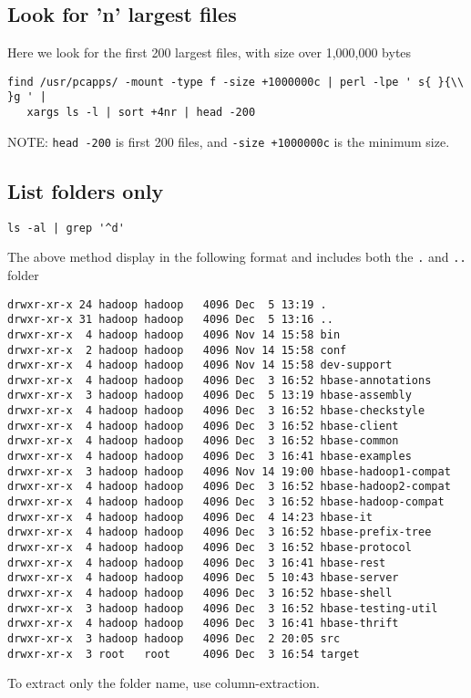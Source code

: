 \subsection{Look for 'n' largest files}

Here we look for the first 200 largest files, with size over 1,000,000 bytes
\begin{verbatim}
find /usr/pcapps/ -mount -type f -size +1000000c | perl -lpe ' s{ }{\\ }g ' |
   xargs ls -l | sort +4nr | head -200
\end{verbatim}
NOTE: \verb!head -200! is first 200 files, and \verb!-size +1000000c! is the
minimum size.

\subsection{List folders only}

\begin{verbatim}
ls -al | grep '^d'
\end{verbatim}
The above method display in the following format and includes both the
\verb!.! and \verb!..! folder
\begin{verbatim}
drwxr-xr-x 24 hadoop hadoop   4096 Dec  5 13:19 .
drwxr-xr-x 31 hadoop hadoop   4096 Dec  5 13:16 ..
drwxr-xr-x  4 hadoop hadoop   4096 Nov 14 15:58 bin
drwxr-xr-x  2 hadoop hadoop   4096 Nov 14 15:58 conf
drwxr-xr-x  4 hadoop hadoop   4096 Nov 14 15:58 dev-support
drwxr-xr-x  4 hadoop hadoop   4096 Dec  3 16:52 hbase-annotations
drwxr-xr-x  3 hadoop hadoop   4096 Dec  5 13:19 hbase-assembly
drwxr-xr-x  4 hadoop hadoop   4096 Dec  3 16:52 hbase-checkstyle
drwxr-xr-x  4 hadoop hadoop   4096 Dec  3 16:52 hbase-client
drwxr-xr-x  4 hadoop hadoop   4096 Dec  3 16:52 hbase-common
drwxr-xr-x  4 hadoop hadoop   4096 Dec  3 16:41 hbase-examples
drwxr-xr-x  3 hadoop hadoop   4096 Nov 14 19:00 hbase-hadoop1-compat
drwxr-xr-x  4 hadoop hadoop   4096 Dec  3 16:52 hbase-hadoop2-compat
drwxr-xr-x  4 hadoop hadoop   4096 Dec  3 16:52 hbase-hadoop-compat
drwxr-xr-x  4 hadoop hadoop   4096 Dec  4 14:23 hbase-it
drwxr-xr-x  4 hadoop hadoop   4096 Dec  3 16:52 hbase-prefix-tree
drwxr-xr-x  4 hadoop hadoop   4096 Dec  3 16:52 hbase-protocol
drwxr-xr-x  4 hadoop hadoop   4096 Dec  3 16:41 hbase-rest
drwxr-xr-x  4 hadoop hadoop   4096 Dec  5 10:43 hbase-server
drwxr-xr-x  4 hadoop hadoop   4096 Dec  3 16:52 hbase-shell
drwxr-xr-x  3 hadoop hadoop   4096 Dec  3 16:52 hbase-testing-util
drwxr-xr-x  4 hadoop hadoop   4096 Dec  3 16:41 hbase-thrift
drwxr-xr-x  3 hadoop hadoop   4096 Dec  2 20:05 src
drwxr-xr-x  3 root   root     4096 Dec  3 16:54 target
\end{verbatim}
To extract only the folder name, use column-extraction. 

